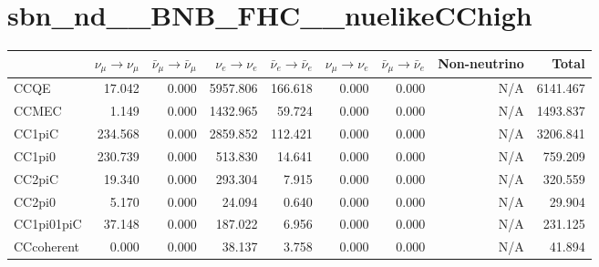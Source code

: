 \newpage
\begin{table}
\section*{sbn\_nd\_\_BNB\_FHC\_\_nuelikeCChigh}
\begin{adjustbox}{width=1\textwidth}
\begin{tabular} {  l r  r  r  r  r  r  r  r  }
\hline
              & $\nu_{\mu} \rightarrow \nu_{\mu}$ & $\bar{\nu}_{\mu} \rightarrow \bar{\nu}_{\mu}$ & $\nu_{e} \rightarrow \nu_{e}$ & $\bar{\nu}_{e} \rightarrow \bar{\nu}_{e}$ & $\nu_{\mu} \rightarrow \nu_{e}$ & $\bar{\nu}_{\mu} \rightarrow \bar{\nu}_{e}$ & Non-neutrino         & Total                \\ \hline\hline
 CCQE         & 17.042               & 0.000                & 5957.806             & 166.618              & 0.000                & 0.000                & N/A                  & 6141.467     
        \\ \hline
 CCMEC        & 1.149                & 0.000                & 1432.965             & 59.724               & 0.000                & 0.000                & N/A                  & 1493.837     
        \\ \hline
 CC1piC       & 234.568              & 0.000                & 2859.852             & 112.421              & 0.000                & 0.000                & N/A                  & 3206.841     
        \\ \hline
 CC1pi0       & 230.739              & 0.000                & 513.830              & 14.641               & 0.000                & 0.000                & N/A                  & 759.209      
        \\ \hline
 CC2piC       & 19.340               & 0.000                & 293.304              & 7.915                & 0.000                & 0.000                & N/A                  & 320.559      
        \\ \hline
 CC2pi0       & 5.170                & 0.000                & 24.094               & 0.640                & 0.000                & 0.000                & N/A                  & 29.904       
        \\ \hline
 CC1pi01piC   & 37.148               & 0.000                & 187.022              & 6.956                & 0.000                & 0.000                & N/A                  & 231.125      
        \\ \hline
 CCcoherent   & 0.000                & 0.000                & 38.137               & 3.758                & 0.000                & 0.000                & N/A                  & 41.894       

\end{tabular}
\end{adjustbox}
\end{table}
